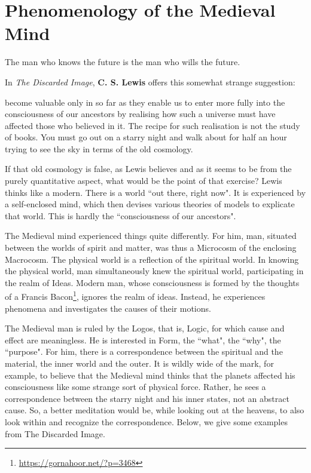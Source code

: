 \section{Phenomenology of the Medieval Mind}

\begin{quotex}
The man who knows the future is the man who wills the future.
\end{quotex}

In \textit{The Discarded Image}, \textbf{C. S. Lewis} offers this somewhat strange suggestion:

\begin{quotex}
[Facts] become valuable only in so far as they enable us to enter more fully into the consciousness of our ancestors by realising how such a universe must have affected those who believed in it. The recipe for such realisation is not the study of books. You must go out on a starry night and walk about for half an hour trying to see the sky in terms of the old cosmology. 

\end{quotex}
If that old cosmology is false, as Lewis believes and as it seems to be from the purely quantitative aspect, what would be the point of that exercise? Lewis thinks like a modern. There is a world ``out there, right now". It is experienced by a self-enclosed mind, which then devises various theories of models to explicate that world. This is hardly the ``consciousness of our ancestors".

The Medieval mind experienced things quite differently. For him, man, situated between the worlds of spirit and matter, was thus a Microcosm of the enclosing Macrocosm. The physical world is a reflection of the spiritual world. In knowing the physical world, man simultaneously knew the spiritual world, participating in the realm of Ideas. Modern man, whose consciousness is formed by the thoughts of a Francis Bacon\footnote{\url{https://gornahoor.net/?p=3468}}, ignores the realm of ideas. Instead, he experiences phenomena and investigates the causes of their motions.

The Medieval man is ruled by the Logos, that is, Logic, for which cause and effect are meaningless. He is interested in Form, the ``what", the ``why", the ``purpose". For him, there is a correspondence between the spiritual and the material, the inner world and the outer. It is wildly wide of the mark, for example, to believe that the Medieval mind thinks that the planets affected his consciousness like some strange sort of physical force. Rather, he sees a correspondence between the starry night and his inner states, not an abstract cause. So, a better meditation would be, while looking out at the heavens, to also look within and recognize the correspondence. Below, we give some examples from The Discarded Image.

